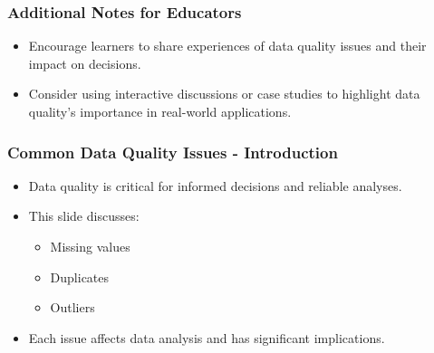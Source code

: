 \documentclass{beamer}
\begin{document}
\begin{frame}[fragile]
    \frametitle{Additional Notes for Educators}
    \begin{itemize}
        \item Encourage learners to share experiences of data quality issues and their impact on decisions.
        \item Consider using interactive discussions or case studies to highlight data quality's importance in real-world applications.
    \end{itemize}
\end{frame}

\begin{frame}[fragile]
    \frametitle{Common Data Quality Issues - Introduction}
    \begin{itemize}
        \item Data quality is critical for informed decisions and reliable analyses.
        \item This slide discusses:
        \begin{itemize}
            \item Missing values
            \item Duplicates
            \item Outliers
        \end{itemize}
        \item Each issue affects data analysis and has significant implications.
    \end{itemize}
\end{frame}
\end{document}
